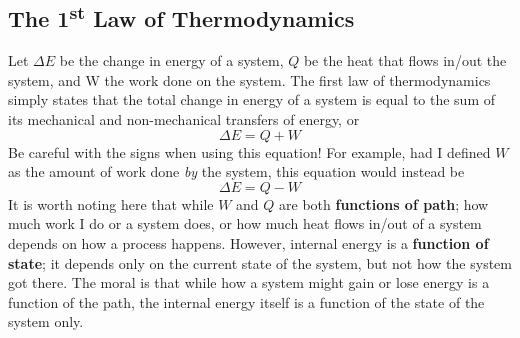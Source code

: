 \subsection{\texorpdfstring{The 1\textsuperscript{st} Law of Thermodynamics}{The 1st Law of Thermodynamics}}
Let $\Delta E$ be the change in energy of a system, $Q$ be the heat that flows in/out the system, and W the work done on the system. The first law of thermodynamics simply states that the total change in energy of a system is equal to the sum of its mechanical and non-mechanical transfers of energy, or
\begin{equation}
    \Delta E=Q+W
\end{equation}
Be careful with the signs when using this equation! For example, had I defined $W$ as the amount of work done \textit{by} the system, this equation would instead be
\begin{equation*}
    \Delta E=Q-W
\end{equation*}
It is worth noting here that while $W$ and $Q$ are both \textbf{functions of path}; how much work I do or a system does, or how much heat flows in/out of a system depends on how a process happens. However, internal energy is a \textbf{function of state}; it depends only on the current state of the system, but not how the system got there. The moral is that while how a system might gain or lose energy is a function of the path, the internal energy itself is a function of the state of the system only.